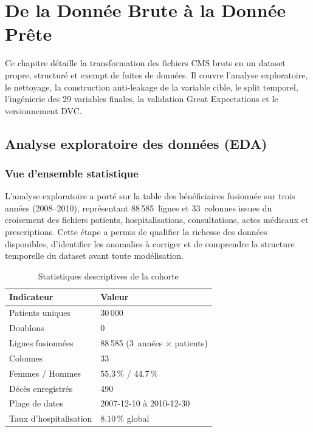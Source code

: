 \chapter{De la Donnée Brute à la Donnée Prête}
\label{chap:data}

\begin{infobox}
Ce chapitre détaille la transformation des fichiers CMS bruts en un dataset propre,
structuré et exempt de fuites de données. Il couvre l'analyse exploratoire,
le nettoyage, la construction anti-leakage de la variable cible, le split temporel,
l'ingénierie des 29 variables finales, la validation Great Expectations et le
versionnement DVC.
\end{infobox}

\section{Analyse exploratoire des données (EDA)}

\subsection{Vue d'ensemble statistique}

L'analyse exploratoire a porté sur la table des bénéficiaires fusionnée sur trois
années (2008--2010), représentant 88\,585~lignes et 33~colonnes issues du croisement
des fichiers patients, hospitalisations, consultations, actes médicaux et prescriptions.
Cette étape a permis de qualifier la richesse des données disponibles, d'identifier
les anomalies à corriger et de comprendre la structure temporelle du dataset avant
toute modélisation.

\begin{table}[htbp]
\centering
\caption{Statistiques descriptives de la cohorte}
\label{tab:eda_stats}
\begin{tabular}{@{}ll@{}}
\toprule
\textbf{Indicateur} & \textbf{Valeur} \\
\midrule
Patients uniques         & 30\,000 \\
Doublons                 & 0 \\
Lignes fusionnées        & 88\,585 (3~années $\times$ patients) \\
Colonnes                 & 33 \\
Femmes / Hommes          & 55.3\,\% / 44.7\,\% \\
Décès enregistrés        & 490 \\
Plage de dates           & 2007-12-10 à 2010-12-30 \\
Taux d'hospitalisation   & 8.10\,\% global \\
\bottomrule
\end{tabular}
\end{table}

